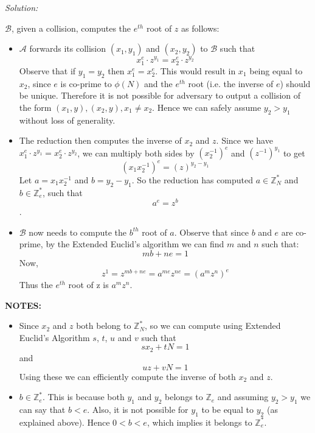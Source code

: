 \documentclass[a4paper, 11pt]{article}
\newenvironment{solution}
    {\textit{Solution:}}
    {\clearpage}
\newcommand{\Z}{\mathbb{Z}}
\newcommand{\calA}{\mathcal{A}}
\newcommand{\calB}{\mathcal{B}}
\begin{document}
\begin{solution}
\begin{enumerate}[(a)]
        $\calB$, given a collision, computes the $e^{th}$ root of $z$ as follows:
        \begin{itemize}
            \item $\calA$ forwards its collision $(x_1, y_1)$ and $(x_2, y_2)$ to $\calB$ such that $$x_1^e \cdot z^{y_1} = x_2^e \cdot z^{y_2}$$
            Observe that if $y_1=y_2$ then $x_1^e=x_2^e$. This would result in $x_1$ being equal to $x_2$, since $e$ is co-prime to $\phi(N)$ and the $e^{th}$ root (i.e. the inverse of $e$) should be unique. Therefore it is not possible for adversary to output a collision of the form $(x_1, y), (x_2, y), x_1\neq x_2$. Hence we can safely assume $y_2>y_1$ without loss of generality.
            \item The reduction then computes the inverse of $x_2$ and $z$. Since we have $x_1^e \cdot z^{y_1} = x_2^e \cdot z^{y_2}$, we can multiply both sides by $(x_2^{-1})^e$ and $(z^{-1})^{y_1}$ to get $$(x_1x_2^{-1})^e = (z)^{y_2 - y_1}$$ 
            Let $a=x_1x_2^{-1}$ and $b=y_2 - y_1$. So the reduction has computed $a \in \Z^*_N$ and $b \in \Z^*_e$, such that $$a^e = z^b$$.
            \item $\calB$ now needs to compute the $b^{th}$ root of $a$. Observe that since $b$ and $e$ are co-prime, by the Extended Euclid's algorithm we can find $m$ and $n$ such that:
            $$mb+ne=1$$
            Now,
            $$z^1=z^{mb+ne}=a^{me}z^{ne}=(a^mz^n)^e$$
            Thus the $e^{th}$ root of z is $a^mz^n$.
        \end{itemize}
        \textbf{NOTES:} 
        \begin{itemize}
            \item Since $x_2$ and $z$ both belong to $\Z^*_N$, so we can compute using Extended Euclid's Algorithm $s$, $t$, $u$ and $v$ such that $$sx_2 + tN = 1$$ and $$uz + vN = 1$$ Using these we can efficiently compute the inverse of both $x_2$ and $z$.

            \item $b \in \Z^*_e$. This is because both $y_1$ and $y_2$ belongs to $\Z_e$ and assuming $y_2 > y_1$  we can say that $b < e$. Also, it is not possible for $y_1$ to be equal to $y_2$ (as explained above). Hence $0<b < e$, which implies it belongs to $\Z^*_e$.
        \end{itemize}
    
    \end{enumerate}
\end{solution}
\end{document}
